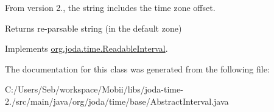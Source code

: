 From version 2., the string includes the time zone offset.

\begin{DoxyReturn}{Returns}
re-\/parsable string (in the default zone) 
\end{DoxyReturn}


Implements \hyperlink{interfaceorg_1_1joda_1_1time_1_1_readable_interval_af32340c8eb3d8086dac54fe15bc414f2}{org.\-joda.\-time.\-Readable\-Interval}.



The documentation for this class was generated from the following file\-:\begin{DoxyCompactItemize}
\item 
C\-:/\-Users/\-Seb/workspace/\-Mobii/libs/joda-\/time-\/2./src/main/java/org/joda/time/base/Abstract\-Interval.\-java\end{DoxyCompactItemize}
